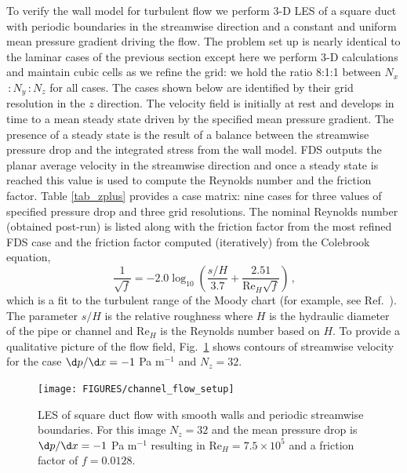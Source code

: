 \documentclass[11pt]{book}
\begin{document}
To verify the wall model for turbulent flow we perform 3-D LES of a square duct with periodic boundaries in the streamwise direction and a constant and uniform mean pressure gradient driving the flow.  The problem set up is nearly identical to the laminar cases of the previous section except here we perform 3-D calculations and maintain cubic cells as we refine the grid: we hold the ratio 8:1:1 between $N_x$\,:\,$N_y$\,:\,$N_z$ for all cases.  The cases shown below are identified by their grid resolution in the $z$ direction.  The velocity field is initially at rest and develops in time to a mean steady state driven by the specified mean pressure gradient.  The presence of a steady state is the result of a balance between the streamwise pressure drop and the integrated stress from the wall model.  FDS outputs the planar average velocity in the streamwise direction and once a steady state is reached this value is used to compute the Reynolds number and the friction factor.  Table \ref{tab_zplus} provides a case matrix: nine cases for three values of specified pressure drop and three grid resolutions.  The nominal Reynolds number (obtained post-run) is listed along with the friction factor from the most refined FDS case and the friction factor computed (iteratively) from the Colebrook equation,
\begin{equation}
\label{eqn_colebrook}
\frac{1}{\sqrt{f}} = -2.0 \log_{10} \left( \frac{s/H}{3.7} + \frac{2.51}{\mbox{Re}_H\sqrt{f}} \right) \,\mbox{,}
\end{equation}
which is a fit to the turbulent range of the Moody chart (for example, see Ref.~\cite{MYO}).  The parameter $s/H$ is the relative
roughness where $H$ is the hydraulic diameter of the pipe or channel and Re$_H$ is the Reynolds number based on $H$.
To provide a qualitative picture of the flow field, Fig.~\ref{fig_channel_flow_setup} shows contours of streamwise velocity
for the case $\d p/\d x = -1$ Pa m$^{-1}$ and $N_z=32$.

\begin{figure}
\centering
\texttt{[image: FIGURES/channel\_flow\_setup]}
\caption[LES of square duct flow]{LES of square duct flow with smooth walls and periodic streamwise boundaries.  For this image $N_z=32$ and the mean pressure drop is $\d p/ \d x = -1$ Pa m$^{-1}$ resulting in Re$_H = 7.5\times 10^5$ and a friction factor of $f=0.0128$.}
\label{fig_channel_flow_setup}
\end{figure}
\end{document}
